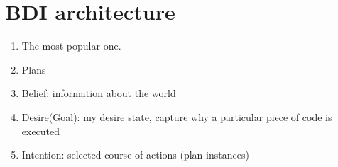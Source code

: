 \documentclass[11pt]{article}
\begin{document}
\section{BDI architecture} %
\label{sec:bdi_architecture}
\begin{enumerate}
	\item The most popular one.
	\item Plans
	\item Belief: information about the world
	\item Desire(Goal): my desire state, capture why a particular piece of code is executed
	\item Intention: selected course of actions (plan instances)
\end{enumerate}
\end{document}
